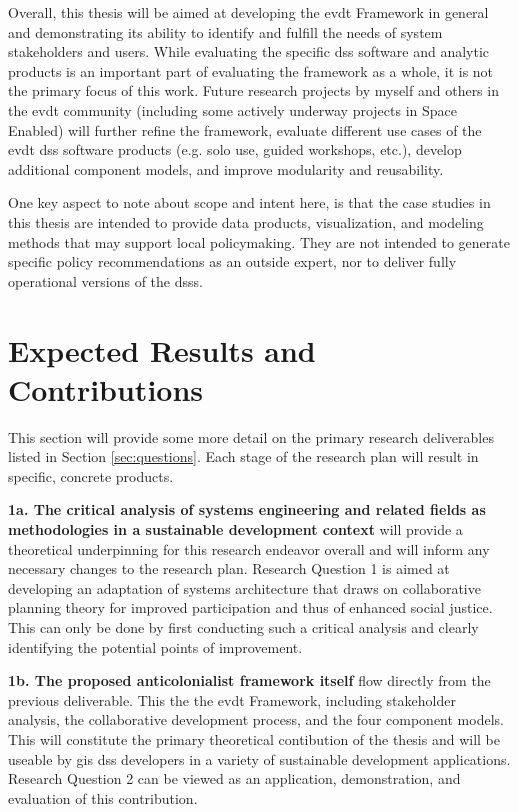 \documentclass[notitlepage]{article}
\begin{document}
\color{OliveGreen}

Overall, this thesis will be aimed at developing the \ac{evdt} Framework in general and demonstrating its ability to identify and fulfill the needs of system stakeholders and users. While evaluating the specific \ac{dss} software and analytic products is an important part of evaluating the framework as a whole, it is not the primary focus of this work. Future research projects by myself and others in the \ac{evdt} community (including some actively underway projects in Space Enabled) will further refine the framework, evaluate different use cases of the \ac{evdt} \ac{dss} software products (e.g. solo use, guided workshops, etc.), develop additional component models, and improve modularity and reusability.

\color{black} 

One key aspect to note about scope and intent here, is that \color{OliveGreen} the case studies in this thesis are intended to provide data products, visualization, and modeling methods that may support local policymaking. They are not intended \color{black} to generate specific policy recommendations as an outside expert, nor to deliver fully operational versions of the \acp{dss}. 

\section{Expected Results and Contributions}

This section will provide some more detail on the primary research deliverables listed in Section \ref{sec:questions}. Each stage of the research plan will result in specific, concrete products.

\textbf{1a. The critical analysis of systems engineering and related fields as methodologies in a sustainable development context} will provide a theoretical underpinning for this research endeavor overall and will inform any necessary changes to the research plan. Research Question 1 is aimed at developing an adaptation of systems architecture that draws on collaborative planning theory for improved participation and thus of enhanced social justice. This can only be done by first conducting such a critical analysis and clearly identifying the potential points of improvement.

\textbf{1b. The proposed anticolonialist framework itself} flow directly from the previous deliverable. \color{OliveGreen} This the the \ac{evdt} Framework, including stakeholder analysis, the collaborative development process, and the four component models. \color{black} This will constitute the primary theoretical contibution of the thesis \color{OliveGreen} and will be useable by \ac{gis} \ac{dss} developers in a variety of sustainable development applications. \color{black} Research Question 2 can be viewed as an application, demonstration, and evaluation of this contribution.
\end{document}
